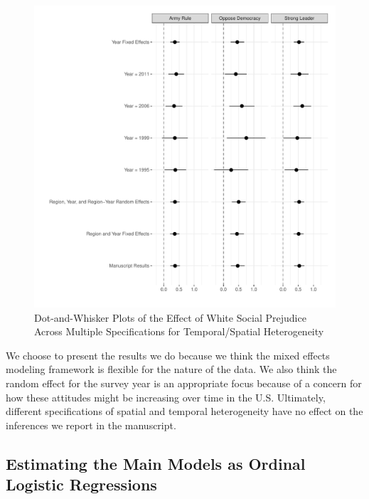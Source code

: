 \documentclass[11pt,]{article}
\begin{document}
\begin{figure}
\centering
\includegraphics{figs/fuckitwelldoitlive.pdf}
\caption{\label{fig:fuckitwelldoitlive}Dot-and-Whisker Plots of the
Effect of White Social Prejudice Across Multiple Specifications for
Temporal/Spatial Heterogeneity}
\end{figure}

We choose to present the results we do because we think the mixed
effects modeling framework is flexible for the nature of the data. We
also think the random effect for the survey year is an appropriate focus
because of a concern for how these attitudes might be increasing over
time in the U.S. Ultimately, different specifications of spatial and
temporal heterogeneity have no effect on the inferences we report in the
manuscript.

\hypertarget{estimating-the-main-models-as-ordinal-logistic-regressions}{%
\subsection{Estimating the Main Models as Ordinal Logistic
Regressions}\label{estimating-the-main-models-as-ordinal-logistic-regressions}}
\end{document}
